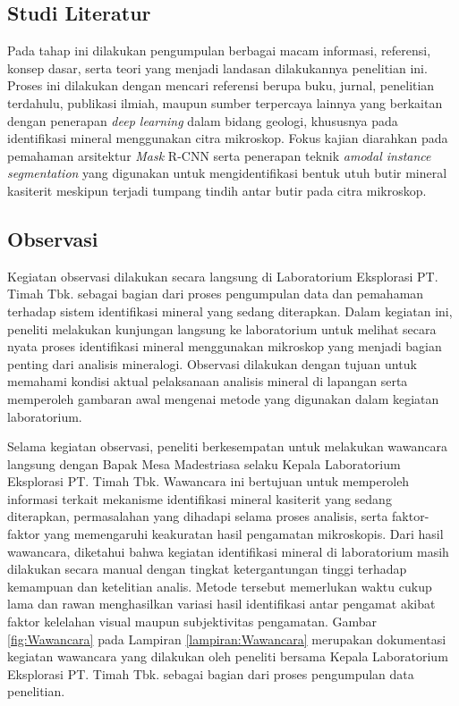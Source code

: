 \subsection{Studi Literatur} \label{III.LangkahStudiLiteratur}
Pada tahap ini dilakukan pengumpulan berbagai macam informasi, referensi, konsep dasar, serta teori yang menjadi landasan dilakukannya penelitian ini. Proses ini dilakukan dengan mencari referensi berupa buku, jurnal, penelitian terdahulu, publikasi ilmiah, maupun sumber terpercaya lainnya yang berkaitan dengan penerapan \textit{deep learning} dalam bidang geologi, khususnya pada identifikasi mineral menggunakan citra mikroskop. Fokus kajian diarahkan pada pemahaman arsitektur \textit{Mask} R-CNN serta penerapan teknik \textit{amodal instance segmentation} yang digunakan untuk mengidentifikasi bentuk utuh butir mineral kasiterit meskipun terjadi tumpang tindih antar butir pada citra mikroskop. \par

\subsection{Observasi} \label{III.LangkahObservasi}
Kegiatan observasi dilakukan secara langsung di Laboratorium Eksplorasi PT. Timah Tbk. sebagai bagian dari proses pengumpulan data dan pemahaman terhadap sistem identifikasi mineral yang sedang diterapkan. Dalam kegiatan ini, peneliti melakukan kunjungan langsung ke laboratorium untuk melihat secara nyata proses identifikasi mineral menggunakan mikroskop yang menjadi bagian penting dari analisis mineralogi. Observasi dilakukan dengan tujuan untuk memahami kondisi aktual pelaksanaan analisis mineral di lapangan serta memperoleh gambaran awal mengenai metode yang digunakan dalam kegiatan laboratorium. \par

Selama kegiatan observasi, peneliti berkesempatan untuk melakukan wawancara langsung dengan Bapak Mesa Madestriasa selaku Kepala Laboratorium Eksplorasi PT. Timah Tbk. Wawancara ini bertujuan untuk memperoleh informasi terkait mekanisme identifikasi mineral kasiterit yang sedang diterapkan, permasalahan yang dihadapi selama proses analisis, serta faktor-faktor yang memengaruhi keakuratan hasil pengamatan mikroskopis. Dari hasil wawancara, diketahui bahwa kegiatan identifikasi mineral di laboratorium masih dilakukan secara manual dengan tingkat ketergantungan tinggi terhadap kemampuan dan ketelitian analis. Metode tersebut memerlukan waktu cukup lama dan rawan menghasilkan variasi hasil identifikasi antar pengamat akibat faktor kelelahan visual maupun subjektivitas pengamatan. Gambar \ref{fig:Wawancara} pada Lampiran \ref{lampiran:Wawancara} merupakan dokumentasi kegiatan wawancara yang dilakukan oleh peneliti bersama Kepala Laboratorium Eksplorasi PT. Timah Tbk. sebagai bagian dari proses pengumpulan data penelitian. \par


